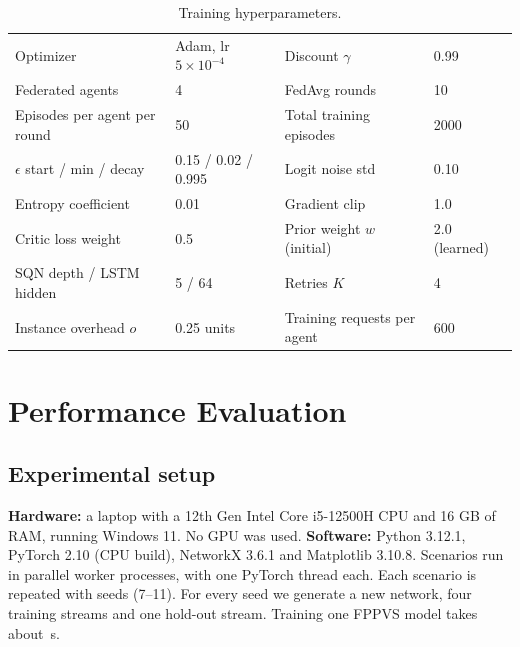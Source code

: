 \documentclass[11pt,a4paper]{article}
\begin{document}
\begin{table}[H]
\centering\small
\caption{Training hyperparameters.}
\label{tab:hyper}
\begin{tabular}{ll@{\qquad}ll}
\toprule
Optimizer & Adam, lr $5\times10^{-4}$ & Discount $\gamma$ & 0.99 \\
Federated agents & 4 & FedAvg rounds & 10 \\
Episodes per agent per round & 50 & Total training episodes & 2000 \\
$\epsilon$ start / min / decay & 0.15 / 0.02 / 0.995 & Logit noise std & 0.10 \\
Entropy coefficient & 0.01 & Gradient clip & 1.0 \\
Critic loss weight & 0.5 & Prior weight $w$ (initial) & 2.0 (learned) \\
SQN depth / LSTM hidden & 5 / 64 & Retries $K$ & 4 \\
Instance overhead $o$ & 0.25 units & Training requests per agent & 600 \\
\bottomrule
\end{tabular}
\end{table}

\section{Performance Evaluation}

\subsection{Experimental setup}
\textbf{Hardware:} a laptop with a 12th Gen Intel Core i5-12500H CPU and 16 GB of
RAM, running Windows 11. No GPU was used. \textbf{Software:} Python 3.12.1,
PyTorch 2.10 (CPU build), NetworkX 3.6.1 and Matplotlib 3.10.8. Scenarios run in
parallel worker processes, with one PyTorch thread each. Each scenario is
repeated with \numSeeds{} seeds (7--11). For every seed we generate a new
network, four training streams and one hold-out stream. Training one FPPVS model
takes about \trainSeconds\,s.
\end{document}
